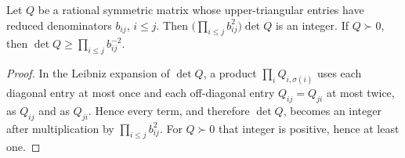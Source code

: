 \begin{lemma}
\label{lem:heights-det-denominators}
Let $Q$ be a rational symmetric matrix whose upper-triangular entries have
reduced denominators $b_{ij}$, $i\le j$. Then
$\bigl(\prod_{i\le j}b_{ij}^2\bigr)\det Q$ is an integer. If $Q\succ0$, then
$\det Q\ge\prod_{i\le j}b_{ij}^{-2}$.
\end{lemma}

\begin{proof}
In the Leibniz expansion of $\det Q$, a product
$\prod_iQ_{i,\sigma(i)}$ uses each diagonal entry at most once and each
off-diagonal entry $Q_{ij}=Q_{ji}$ at most twice, as $Q_{ij}$ and as $Q_{ji}$.
Hence every term, and therefore $\det Q$, becomes an integer after
multiplication by $\prod_{i\le j}b_{ij}^2$. For $Q\succ0$ that integer is
positive, hence at least one.
\end{proof}

